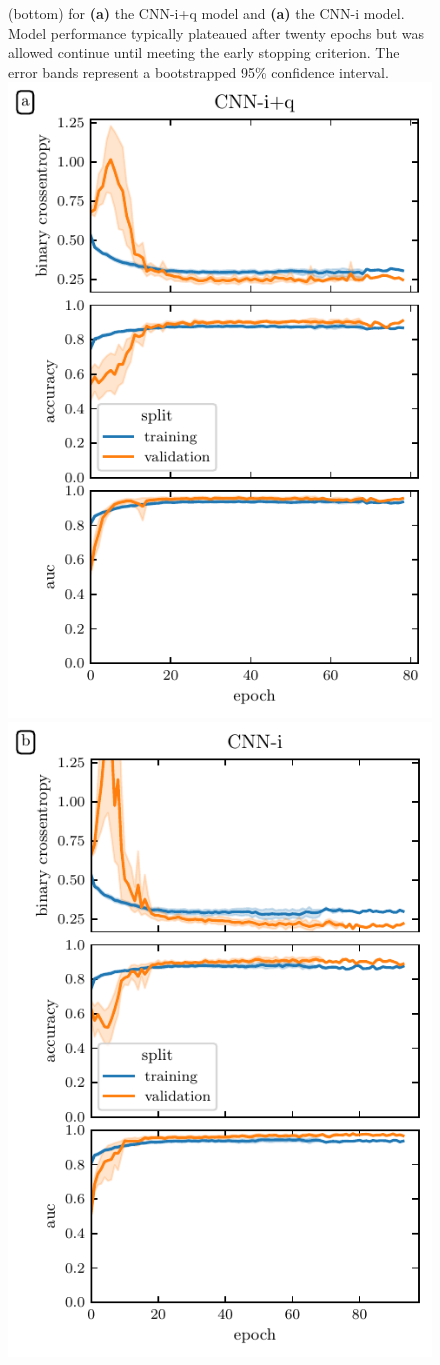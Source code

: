 \documentclass[9pt,lineno]{elife}
\begin{document}
\begin{figure}[tbp]
\begin{fullwidth}
{        (bottom) for \textbf{(a)} the CNN-i+q model and \textbf{(a)} the CNN-i
        model. Model performance typically plateaued after twenty epochs but was
        allowed continue until meeting the early stopping criterion. The error
        bands represent a bootstrapped 95\% confidence interval.
    }{%
        \hfill
        \includegraphics[width=0.45\linewidth]{deep-learning-qc/dl_learning_curve_with_qc.pdf}
        \hfill
        \includegraphics[width=0.45\linewidth]{deep-learning-qc/dl_learning_curve_without_qc.pdf}
        \hfill
    }\label{figsupp:dl-loss}
\end{fullwidth}
\end{figure}
\end{document}
